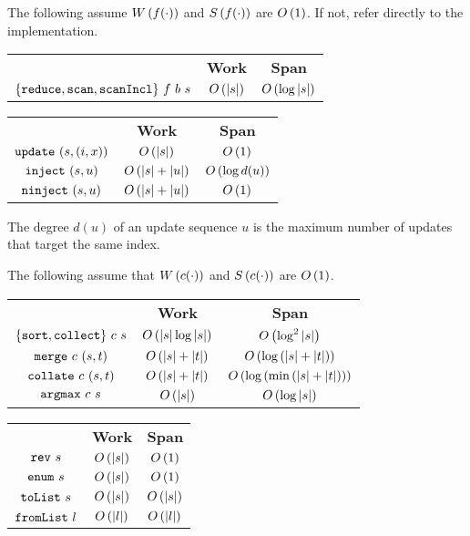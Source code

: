 \begin{costspec}
The following assume $W\left({f(\cdot)}\right)$ and $S\left({f(\cdot)}\right)$ are $O\left({1}\right)$. If not,
refer directly to the implementation.
\begin{tabular}{c|c|c}
& \textbf{Work} & \textbf{Span} \\
%
$\{\texttt{reduce},\texttt{scan},\texttt{scanIncl}\}~f~b~s$ &
$\displaystyle O\left({|s|}\right)$ &
$\displaystyle O\left({\log{|s|}}\right)$
%
\end{tabular}
\end{costspec}

\begin{costspec}[Updates]

\begin{tabular}{c|c|c}
& \textbf{Work} & \textbf{Span} \\
%
$\texttt{update}~(s,(i,x))$ &
$O\left({|s|}\right)$ &
$O\left({1}\right)$ \\
%
$\texttt{inject}~(s,u)$ &
$O\left({|s| + |u|}\right)$ &
$O\left({\log d(u)}\right)$ \\
%
$\texttt{ninject}~(s,u)$ &
$O\left({|s| + |u|}\right)$ &
$O\left({1}\right)$ \\
%
\end{tabular}

The degree $d(u)$ of an update sequence $u$ is the maximum number of
updates that target the same index.
\end{costspec}

\begin{costspec}
The following assume that $W\left({c(\cdot)}\right)$ and $S\left({c(\cdot)}\right)$ are $O\left({1}\right)$.
\begin{tabular}{c|c|c}
& \textbf{Work} & \textbf{Span} \\
%
$\{\texttt{sort},\texttt{collect}\}~c~s$ &
$\displaystyle O\left({|s|\log{|s|}}\right)$ &
$\displaystyle O\left({\log^2{|s|}}\right)$ \\
%
$\texttt{merge}~c~(s,t)$ &
$\displaystyle O\left({|s| + |t|}\right)$ &
$\displaystyle O\left({\log\left(|s| + |t|\right)}\right)$ \\
%
$\texttt{collate}~c~(s,t)$ &
$\displaystyle O\left({|s| + |t|}\right)$ &
$\displaystyle O\left({\log\left(\min\left(|s| + |t|\right)\right)}\right)$ \\
%
$\texttt{argmax}~c~s$ &
$\displaystyle O\left({|s|}\right)$ &
$\displaystyle O\left({\log{|s|}}\right)$ \\
%
\end{tabular}
\end{costspec}

\begin{costspec}[Miscellaneous]

\begin{tabular}{c|c|c}
& \textbf{Work} & \textbf{Span} \\
%
$\texttt{rev}~s$ &
$\displaystyle O\left({|s|}\right)$ &
$\displaystyle O\left({1}\right)$ \\
%
$\texttt{enum}~s$ &
$\displaystyle O\left({|s|}\right)$ &
$\displaystyle O\left({1}\right)$ \\
%
$\texttt{toList}~s$ &
$O\left({|s|}\right)$ &
$O\left({|s|}\right)$ \\
%
$\texttt{fromList}~l$ &
$O\left({|l|}\right)$ &
$O\left({|l|}\right)$ \\
%
\end{tabular}
\end{costspec}

